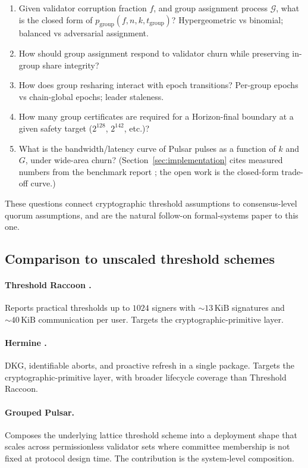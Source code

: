 \begin{enumerate}[leftmargin=2em,nosep]
  \item Given validator corruption fraction $f$, and group assignment process $\mathcal{G}$, what is the closed form of $p_{\mathrm{group}}(f, n, k, t_{\mathrm{group}})$? Hypergeometric vs binomial; balanced vs adversarial assignment.
  \item How should group assignment respond to validator churn while preserving in-group share integrity?
  \item How does group resharing interact with epoch transitions? Per-group epochs vs chain-global epochs; leader staleness.
  \item How many group certificates are required for a Horizon-final boundary at a given safety target ($2^{128}$, $2^{142}$, etc.)?
  \item What is the bandwidth/latency curve of Pulsar pulses as a function of $k$ and $G$, under wide-area churn? (Section~\ref{sec:implementation} cites measured numbers from the benchmark report \cite{luxbenchmarks}; the open work is the closed-form trade-off curve.)
\end{enumerate}

These questions connect cryptographic threshold assumptions to consensus-level quorum assumptions, and are the natural follow-on formal-systems paper to this one.

\subsection{Comparison to unscaled threshold schemes}

\paragraph{Threshold Raccoon \cite{thresholdraccoon}.} Reports practical thresholds up to $1024$ signers with $\sim 13\,\mathrm{KiB}$ signatures and $\sim 40\,\mathrm{KiB}$ communication per user. Targets the cryptographic-primitive layer.

\paragraph{Hermine \cite{hermine}.} DKG, identifiable aborts, and proactive refresh in a single package. Targets the cryptographic-primitive layer, with broader lifecycle coverage than Threshold Raccoon.

\paragraph{Grouped Pulsar.} Composes the underlying lattice threshold scheme into a deployment shape that scales across permissionless validator sets where committee membership is not fixed at protocol design time. The contribution is the system-level composition.

